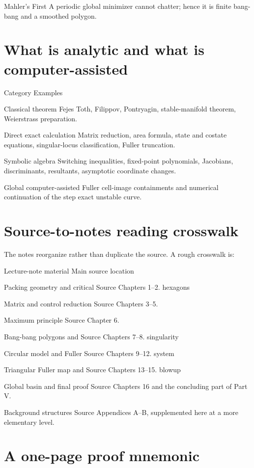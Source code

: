 Mahler’s First A periodic global minimizer cannot chatter; hence it is finite bang-bang and a smoothed polygon.


\section{What is analytic and what is computer-assisted}

Category Examples


Classical theorem Fejes Toth, Filippov, Pontryagin, stable-manifold theorem, Weierstrass preparation.


Direct exact calculation Matrix reduction, area formula, state and costate equations, singular-locus classification, Fuller truncation.


Symbolic algebra Switching inequalities, fixed-point polynomials, Jacobians, discriminants, resultants, asymptotic coordinate changes.


Global computer-assisted Fuller cell-image containments and numerical continuation of the step exact unstable curve.


\section{Source-to-notes reading crosswalk}

The notes reorganize rather than duplicate the source. A rough crosswalk is:


Lecture-note material Main source location


Packing geometry and critical Source Chapters 1–2. hexagons


Matrix and control reduction Source Chapters 3–5.


Maximum principle Source Chapter 6.


Bang-bang polygons and Source Chapters 7–8. singularity


Circular model and Fuller Source Chapters 9–12. system


Triangular Fuller map and Source Chapters 13–15. blowup


Global basin and final proof Source Chapters 16 and the concluding part of Part V.


Background structures Source Appendices A–B, supplemented here at a more elementary level.


\section{A one-page proof mnemonic}

